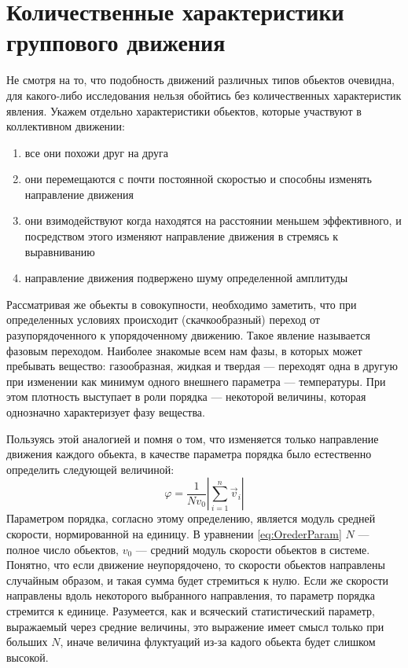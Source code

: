 \section{Количественные характеристики группового движения} %
\label{sec:NumericalCharacteristicsCollMot}
    Не смотря на то, что подобность движений различных типов обьектов очевидна, для какого-либо исследования нельзя обойтись без количественных характеристик явления.
    Укажем отдельно характеристики обьектов, которые участвуют в коллективном движении:
    \begin{enumerate}
        \item все они похожи друг на друга
        \item они перемещаются с почти постоянной скоростью и способны изменять направление движения
        \item они взимодействуют когда находятся на расстоянии меньшем эффективного, и посредством этого изменяют направление движения в стремясь к выравниванию
        \item направление движения подвержено шуму определенной амплитуды
    \end{enumerate}

    Рассматривая же обьекты в совокупности, необходимо заметить, что при определенных условиях происходит (скачкообразный) переход от разупорядоченного к упорядоченному движению. Такое явление называется фазовым переходом. Наиболее знакомые всем нам фазы, в которых может пребывать вещество: газообразная, жидкая и твердая --- переходят одна в другую при изменении как минимум одного внешнего параметра --- температуры. При этом плотность выступает в роли { порядка} --- некоторой величины, которая однозначно характеризует фазу вещества.

    Пользуясь этой аналогией и помня о том, что изменяется только направление движения каждого обьекта, в качестве параметра порядка было естественно определить следующей величиной:
    \begin{equation}\label{eq:OrederParam}
        \varphi = \frac{1}{N v_0} |{\sum\limits_{i=1}^n \vec{v}_i}|
    \end{equation}
    Параметром порядка, согласно этому определению, является модуль средней скорости, нормированной на единицу. В уравнении \ref{eq:OrederParam} $N$ --- полное число обьектов, $v_0$ --- средний модуль скорости обьектов в системе. Понятно, что если движение неупорядочено, то скорости обьектов направлены случайным образом, и такая сумма будет стремиться к нулю. Если же скорости направлены вдоль некоторого выбранного направления, то параметр порядка стремится к единице. Разумеется, как и всяческий статистический параметр, выражаемый через средние величины, это выражение имеет смысл только при больших $N$, иначе величина флуктуаций из-за кадого обьекта будет слишком высокой.

